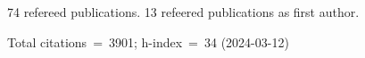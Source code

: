 74 refereed publications. 13 refeered publications as first author.

Total citations~=~3901; h-index~=~34 (2024-03-12)